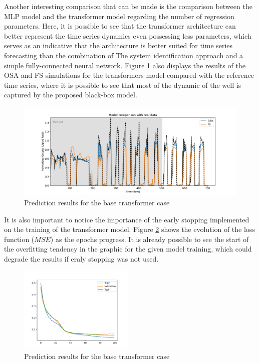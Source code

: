 \documentclass[conference]{IEEEtran}
\begin{document}
Another interesting comparison that can be made is the comparison between the MLP model and the transformer model regarding the number of
regression parameters. Here, it is possible to see that the transformer architecture can better represent the time series dynamics even possessing
less parameters, which serves as an indicative that the architecture is better suited for time series forecasting than the combination of The
system identification approach and a simple fully-connected neural network. Figure \ref{fig:prediction_results} also displays the 
results of the OSA and FS simulations for the transformers model compared with the reference time series, where it is possible to see that
most of the dynamic of the well is captured by the proposed black-box model.

\begin{figure}[htbp]
    \centerline{\includegraphics[width=6.0in]{images/prediction_best_model.pdf}}
    \caption{Prediction results for the base transformer case}
    \label{fig:prediction_results}
\end{figure}

It is also important to notice the importance of the early stopping implemented on the training of the transformer model. Figure \ref{fig:error_convergence} shows
the evolution of the loss function ($MSE$) as the epochs progress. It is already possible to see the start of the overfitting tendency in the graphic for the given 
model training, which could degrade the results if eraly stopping was not used.

\begin{figure}[htbp]
    \centerline{\includegraphics[width=0.49\textwidth]{images/error_convergence.pdf}}
    \caption{Prediction results for the base transformer case}
    \label{fig:error_convergence}
\end{figure}
\end{document}
